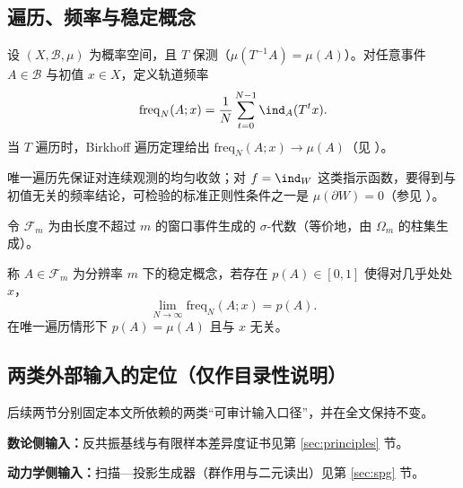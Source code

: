 \subsection{遍历、频率与稳定概念}\label{subsec:prelim-ergodic-frequency}
设 \((X,\mathcal{B},\mu)\) 为概率空间，且 \(T\) 保测（\(\mu(T^{-1}A)=\mu(A)\)）。对任意事件 \(A\in\mathcal{B}\) 与初值 \(x\in X\)，定义轨道频率
\[
\mathrm{freq}_N(A;x)=\frac1N\sum_{t=0}^{N-1}\ind_A(T^t x).
\]
当 \(T\) 遍历时，Birkhoff 遍历定理给出 \(\mathrm{freq}_N(A;x)\to\mu(A)\)（见 \cite{WaltersErgodicTheory}）。

\begin{remark}[唯一遍历下的指示函数]\label{rem:unique-ergodic-indicator}
唯一遍历先保证对连续观测的均匀收敛；对 \(f=\ind_W\) 这类指示函数，要得到与初值无关的频率结论，可检验的标准正则性条件之一是 \(\mu(\partial W)=0\)（参见 \cite{WaltersErgodicTheory}）。
\end{remark}

令 \(\mathcal{F}_m\) 为由长度不超过 \(m\) 的窗口事件生成的 \(\sigma\)-代数（等价地，由 \(\Omega_m\) 的柱集生成）。
\begin{definition}[统计稳定概念]\label{def:stable-concept}
称 \(A\in\mathcal{F}_m\) 为分辨率 \(m\) 下的稳定概念，若存在 \(p(A)\in[0,1]\) 使得对几乎处处 \(x\)，
\[
\lim_{N\to\infty}\mathrm{freq}_N(A;x)=p(A).
\]
在唯一遍历情形下 \(p(A)=\mu(A)\) 且与 \(x\) 无关。
\end{definition}

\subsection{两类外部输入的定位（仅作目录性说明）}\label{subsec:prelim-input-map}
后续两节分别固定本文所依赖的两类“可审计输入口径”，并在全文保持不变。\par
\textbf{数论侧输入：}反共振基线与有限样本差异度证书见第 \ref{sec:principles} 节。\par
\textbf{动力学侧输入：}扫描—投影生成器（群作用与二元读出）见第 \ref{sec:spg} 节。

